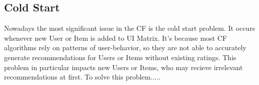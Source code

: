 \documentclass[10pt,a4paper]{article}
\begin{document}
\subsection{Cold Start}
Nowadays the most significant issue in the CF is the cold start problem. It occurs whenever new User or Item is added to UI Matrix. It's because most CF algorithms rely on patterns of user-behavior, so they are not able to accurately generate recommendations for Users or Items without existing ratings. This problem in particular impacts new Users or Items, who may recieve irrelevant recommendations at first. To solve this problem.....




\end{document}
